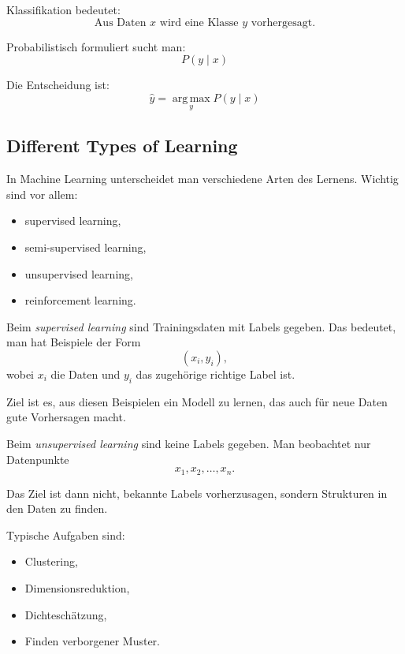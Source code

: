 \documentclass[11pt,a4paper]{scrartcl}
\newcommand{\argmax}{\operatorname*{arg\,max}}
\begin{document}
\begin{answerbox}
    Klassifikation bedeutet:
    \[
        \boxed{
            \text{Aus Daten } x \text{ wird eine Klasse } y \text{ vorhergesagt.}
        }
    \]

    Probabilistisch formuliert sucht man:
    \[
        \boxed{
            P(y \mid x)
        }
    \]

    Die Entscheidung ist:
    \[
        \boxed{
            \hat y = \argmax_y P(y \mid x)
        }
    \]
\end{answerbox}

\subsection{Different Types of Learning}

\begin{notebox}
    In Machine Learning unterscheidet man verschiedene Arten des Lernens.
    Wichtig sind vor allem:

    \begin{itemize}
        \item supervised learning,
        \item semi-supervised learning,
        \item unsupervised learning,
        \item reinforcement learning.
    \end{itemize}
\end{notebox}

\begin{solutionbox}
    Beim \emph{supervised learning} sind Trainingsdaten mit Labels gegeben.
    Das bedeutet, man hat Beispiele der Form
    \[
        (x_i,y_i),
    \]
    wobei \(x_i\) die Daten und \(y_i\) das zugehörige richtige Label ist.

    Ziel ist es, aus diesen Beispielen ein Modell zu lernen, das auch für neue
    Daten gute Vorhersagen macht.
\end{solutionbox}

\begin{solutionbox}
    Beim \emph{unsupervised learning} sind keine Labels gegeben.
    Man beobachtet nur Datenpunkte
    \[
        x_1, x_2, \dots, x_n.
    \]

    Das Ziel ist dann nicht, bekannte Labels vorherzusagen, sondern Strukturen
    in den Daten zu finden.

    Typische Aufgaben sind:
    \begin{itemize}
        \item Clustering,
        \item Dimensionsreduktion,
        \item Dichteschätzung,
        \item Finden verborgener Muster.
    \end{itemize}
\end{solutionbox}
\end{document}
